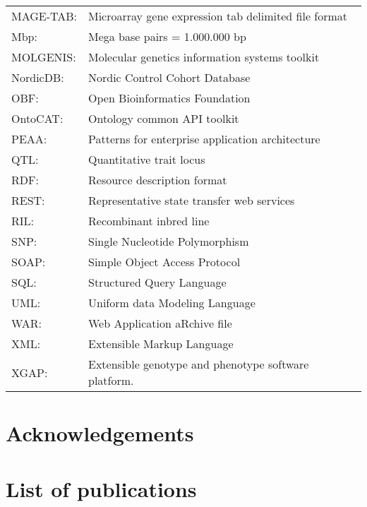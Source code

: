 \documentclass[8pt, twoside, a5paper]{report}
\begin{document}
{\begin{tabular}{ l l }
MAGE-TAB:    & Microarray gene expression tab delimited file format\\
Mbp:         & Mega base pairs = 1.000.000 bp \\
MOLGENIS:    & Molecular genetics information systems toolkit\\
NordicDB:    & Nordic Control Cohort Database\\
OBF:         & Open Bioinformatics Foundation\\
OntoCAT:     & Ontology common API toolkit\\
PEAA:        & Patterns for enterprise application architecture\\
QTL:         & Quantitative trait locus\\
RDF:         & Resource description format\\
REST:        & Representative state transfer web services\\
RIL:         & Recombinant inbred line \\
SNP:         & Single Nucleotide Polymorphism\\
SOAP:        & Simple Object Access Protocol\\
SQL:         & Structured Query Language\\
UML:         & Uniform data Modeling Language\\
WAR:         & Web Application aRchive file\\
XML:         & Extensible Markup Language\\
XGAP:        & Extensible genotype and phenotype software platform. 
\end{tabular}
}
\newpage

\section*{Acknowledgements}
\lipsum[1]

\newpage

\section*{List of publications}
\end{document}
